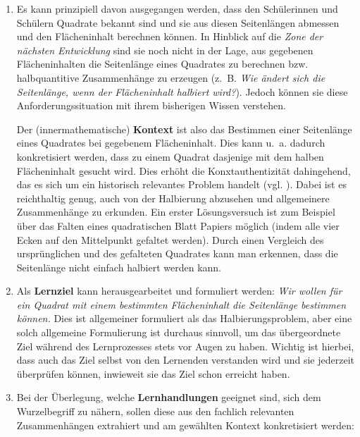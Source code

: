 \documentclass[
]{scrbook}
\theoremstyle{definition}
\theoremstyle{definition}
\theoremstyle{definition}
\theoremstyle{definition}
\theoremstyle{remark}
\begin{document}
\begin{enumerate}
\def\labelenumi{\arabic{enumi}.}
\item
  Es kann prinzipiell davon ausgegangen werden, dass den Schülerinnen und Schülern Quadrate bekannt sind und sie aus diesen Seitenlängen abmessen und den Flächeninhalt berechnen können. In Hinblick auf die \emph{Zone der nächsten Entwicklung} sind sie noch nicht in der Lage, aus gegebenen Flächeninhalten die Seitenlänge eines Quadrates zu berechnen bzw. halbquantitive Zusammenhänge zu erzeugen (z.~B. \emph{Wie ändert sich die Seitenlänge, wenn der Flächeninhalt halbiert wird?}). Jedoch können sie diese Anforderungssituation mit ihrem bisherigen Wissen verstehen.

  Der (innermathematische) \textbf{Kontext} ist also das Bestimmen einer Seitenlänge eines Quadrates bei gegebenem Flächeninhalt. Dies kann u.~a. dadurch konkretisiert werden, dass zu einem Quadrat dasjenige mit dem halben Flächeninhalt gesucht wird. Dies erhöht die Konxtauthentizität dahingehend, das es sich um ein historisch relevantes Problem handelt (vgl. ). Dabei ist es reichthaltig genug, auch von der Halbierung abzusehen und allgemeinere Zusammenhänge zu erkunden. Ein erster Lösungsversuch ist zum Beispiel über das Falten eines quadratischen Blatt Papiers möglich (indem alle vier Ecken auf den Mittelpunkt gefaltet werden). Durch einen Vergleich des ursprünglichen und des gefalteten Quadrates kann man erkennen, dass die Seitenlänge nicht einfach halbiert werden kann.
\item
  Als \textbf{Lernziel} kann herausgearbeitet und formuliert werden: \emph{Wir wollen für ein Quadrat mit einem bestimmten Flächeninhalt die Seitenlänge bestimmen können.} Dies ist allgemeiner formuliert als das Halbierungsproblem, aber eine solch allgemeine Formulierung ist durchaus sinnvoll, um das übergeordnete Ziel während des Lernprozesses stets vor Augen zu haben. Wichtig ist hierbei, dass auch das Ziel selbst von den Lernenden verstanden wird und sie jederzeit überprüfen können, inwieweit sie das Ziel schon erreicht haben.
\item
  Bei der Überlegung, welche \textbf{Lernhandlungen} geeignet sind, sich dem Wurzelbegriff zu nähern, sollen diese aus den fachlich relevanten Zusammenhängen extrahiert und am gewählten Kontext konkretisiert werden:


\end{enumerate}
\end{document}
